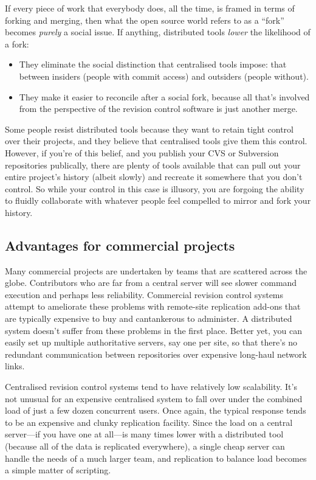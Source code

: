 If every piece of work that everybody does, all the time, is framed in
terms of forking and merging, then what the open source world refers
to as a ``fork'' becomes \emph{purely} a social issue.  If anything,
distributed tools \emph{lower} the likelihood of a fork:
\begin{itemize}
\item They eliminate the social distinction that centralised tools
  impose: that between insiders (people with commit access) and
  outsiders (people without).
\item They make it easier to reconcile after a social fork, because
  all that's involved from the perspective of the revision control
  software is just another merge.
\end{itemize}

Some people resist distributed tools because they want to retain tight
control over their projects, and they believe that centralised tools
give them this control.  However, if you're of this belief, and you
publish your CVS or Subversion repositories publically, there are
plenty of tools available that can pull out your entire project's
history (albeit slowly) and recreate it somewhere that you don't
control.  So while your control in this case is illusory, you are
forgoing the ability to fluidly collaborate with whatever people feel
compelled to mirror and fork your history.

\subsection{Advantages for commercial projects}

Many commercial projects are undertaken by teams that are scattered
across the globe.  Contributors who are far from a central server will
see slower command execution and perhaps less reliability.  Commercial
revision control systems attempt to ameliorate these problems with
remote-site replication add-ons that are typically expensive to buy
and cantankerous to administer.  A distributed system doesn't suffer
from these problems in the first place.  Better yet, you can easily
set up multiple authoritative servers, say one per site, so that
there's no redundant communication between repositories over expensive
long-haul network links.

Centralised revision control systems tend to have relatively low
scalability.  It's not unusual for an expensive centralised system to
fall over under the combined load of just a few dozen concurrent
users.  Once again, the typical response tends to be an expensive and
clunky replication facility.  Since the load on a central server---if
you have one at all---is many times lower with a distributed
tool (because all of the data is replicated everywhere), a single
cheap server can handle the needs of a much larger team, and
replication to balance load becomes a simple matter of scripting.

